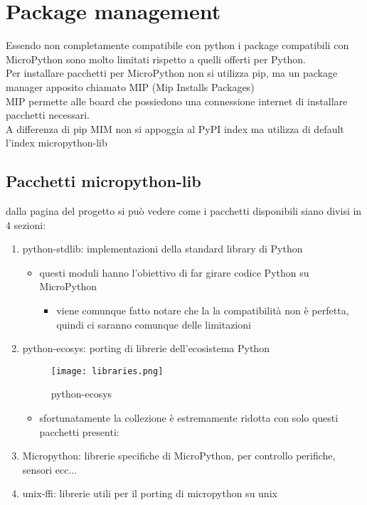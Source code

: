 \documentclass[12pt,a4paper]{report}
\begin{document}
\section{Package management}

Essendo non completamente compatibile con python i package compatibili
con MicroPython sono molto limitati rispetto a quelli offerti per
Python.\\
Per installare pacchetti per MicroPython non si utilizza pip, ma un
package manager apposito chiamato MIP \cite{MIP}
(Mip Installs Packages)\\
MIP permette alle board che possiedono una connessione internet di
installare pacchetti necessari.\\
A differenza di pip MIM non si appoggia al PyPI index ma utilizza di
default l'index micropython-lib \cite{micropython_lib}

\subsection{Pacchetti micropython-lib}\label{pacchetti-micropython-lib}

dalla pagina del progetto \cite{micropython_lib} si può vedere come i pacchetti disponibili siano divisi in
4 sezioni:

\begin{enumerate}
\item
  python-stdlib: implementazioni della standard library di Python \cite{python_standard_library}

  \begin{itemize}
    \item
    questi moduli hanno l'obiettivo di far girare codice
    Python su MicroPython

    \begin{itemize}
        \item
      viene comunque fatto notare che la la compatibilità non è
      perfetta, quindi ci saranno comunque delle limitazioni
    \end{itemize}
  \end{itemize}
\item
  python-ecosys: porting di librerie dell'ecosistema Python
  \begin{figure}
    \centering
    \texttt{[image: libraries.png]}
    \caption{python-ecosys}
\end{figure}
  \begin{itemize}
    \item
    sfortunatamente la collezione è estremamente ridotta con solo questi
    pacchetti presenti:
    
  \end{itemize}
\item
  Micropython: librerie specifiche di MicroPython, per controllo
  perifiche, sensori ecc...
\item
  unix-ffi: librerie utili per il porting di micropython su unix
\end{enumerate}
\end{document}
